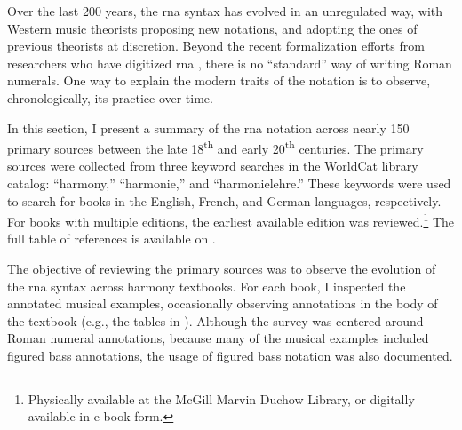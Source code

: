 

Over the last 200 years, the \gls{rna} syntax has evolved in
an unregulated way, with Western music theorists proposing
new notations, and adopting the ones of previous theorists
at discretion. Beyond the recent formalization efforts from
researchers who have digitized \gls{rna}
\parencite{huron1994humdrum, napoleslopez2017automatic,
neuwirth2018annotated, gotham2019romantext,
napoleslopez2020harmalysis, hentschel2021annotated,
hentschel2022towards}, there is no ``standard'' way of
writing Roman numerals. One way to explain the modern traits
of the notation is to observe, chronologically, its practice
over time.

In this section, I present a summary of the \gls{rna}
notation across nearly 150 primary sources between the late
18\textsuperscript{th} and early 20\textsuperscript{th}
centuries. The primary sources were collected from three
keyword searches in the
WorldCat library
catalog: ``harmony,'' ``harmonie,'' and ``harmonielehre.''
These keywords were used to search for books in the English,
French, and German languages, respectively. For books with
multiple editions, the earliest available edition was
reviewed.\footnote{Physically available at the McGill Marvin
Duchow Library, or digitally available in e-book form.} The
full table of references is available on
.


The objective of reviewing the primary sources was to
observe the evolution of the \gls{rna} syntax across harmony
textbooks. For each book, I inspected the annotated musical
examples, occasionally observing annotations in the body of
the textbook (e.g., the tables in
\cite{kirnberger1774kunst}). Although the survey was
centered around Roman numeral annotations, because many of
the musical examples included figured bass annotations, the
usage of figured bass notation was also documented. 
